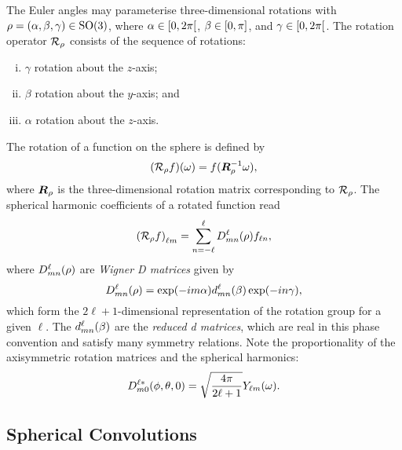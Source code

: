 The Euler angles may parameterise three-dimensional rotations with \(\rho = (\alpha,\beta,\gamma) \in \rotationGroup{}\), where \(\alpha \in \interval[open right]{0}{2\pi}\), \(\beta \in \interval{0}{\pi}\), and \(\gamma \in \interval[open right]{0}{2\pi}\).
The rotation operator \(\rotation{\rho}\) consists of the sequence of rotations:
%
\begin{enumerate}[(i),nosep,left=\parindent]
	\item \({\gamma}\) rotation about the \(z\)-axis;
	\item \({\beta}\) rotation about the \(y\)-axis; and
	\item \({\alpha}\) rotation about the \(z\)-axis.
\end{enumerate}
%
The rotation of a function on the sphere is defined by
%
\begin{equation}\label{eq:chapter3_rotation_matrix}
	\pixel{(\rotation{\rho}f)}
	= f(\rotationMatrix^{-1} \omega),
\end{equation}
%
where \(\rotationMatrix{}\) is the three-dimensional rotation matrix corresponding to \(\rotation{\rho}\).
The spherical harmonic coefficients of a rotated function read
%
\begin{equation}\label{eq:chapter3_rotation_operator}
	\harmonic{(\rotation{\rho}f)}
	= \sum\limits_{n=-\ell}^{\ell} \wigner{\ell}{m}{n}(\rho) f_{\ell n},
\end{equation}
%
where \(\wigner{\ell}{m}{n}(\rho)\) are \emph{Wigner D matrices} given by
%
\begin{equation}
	\wigner{\ell}{m}{n}(\rho)
	= \exp(-i m\alpha) \reducedWigner{\ell}{m}{n}(\beta) \exp(-i n\gamma),
\end{equation}
%
which form the \(2\ell+1\)-dimensional representation of the rotation group for a given \({\ell}\).
The \(\reducedWigner{\ell}{m}{n}(\beta)\) are the \emph{reduced d matrices}, which are real in this phase convention and satisfy many symmetry relations.
Note the proportionality of the axisymmetric rotation matrices and the spherical harmonics:
%
\begin{equation}\label{eq:chapter3_wigner_axisymmetric}
	\wigner[\ast]{\ell}{m}{0}(\phi,\theta,0)
	= \sqrt{\inverseFactor} \pixel{\harmonic{Y}}.
\end{equation}

\subsection{Spherical Convolutions}\label{sec:chapter3_spherical_convolutions}

